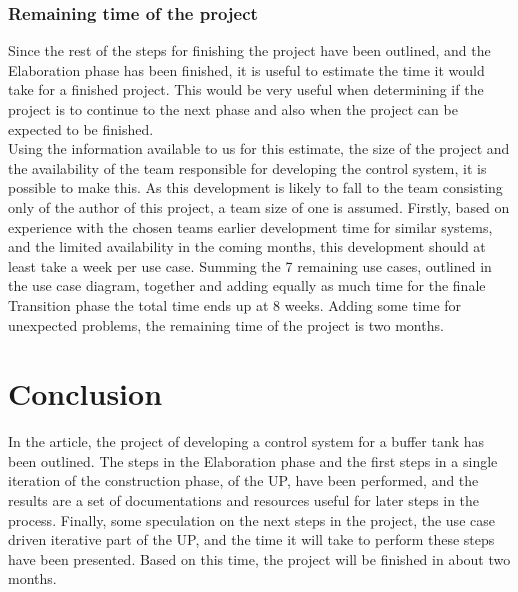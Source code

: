 \documentclass[11pt, A4paper, english]{article}
\begin{document}
			\subsubsection{Remaining time of the project}
Since the rest of the steps for finishing the project have been outlined, and the Elaboration phase has been finished, it is useful to estimate the time it would take for a finished project. This would be very useful when determining if the project is to continue to the next phase and also when the project can be expected to be finished. \\
Using the information available to us for this estimate, the size of the project and the availability of the team responsible for developing the control system, it is possible to make this. As this development is likely to fall to the team consisting only of the author of this project, a team size of one is assumed. Firstly, based on experience with the chosen teams earlier development time for similar systems, and the limited availability in the coming months, this development should at least take a week per use case. Summing the 7 remaining use cases, outlined in the use case diagram, together and adding equally as much time for the finale Transition phase the total time ends up at 8 weeks. Adding some time for unexpected problems, the remaining time of the project is two months.

	\section{Conclusion}
In the article, the project of developing a control system for a buffer tank has been outlined. The steps in the Elaboration phase and the first steps in a single iteration of the construction phase, of the UP, have been performed, and the results are a set of documentations and resources useful for later steps in the process. Finally, some speculation on the next steps in the project, the use case driven iterative part of the UP, and the time it will take to perform these steps have been presented. Based on this time, the project will be finished in about two months.

\clearpage

\printbibliography
\end{document}
